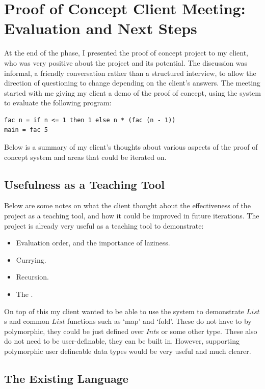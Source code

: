 \section{Proof of Concept Client Meeting: Evaluation and Next Steps}
\label{eval:c1_client}
At the end of the phase, I presented the proof of concept project to my client, who was very positive about the project and its potential. The discussion was informal, a friendly conversation rather than a structured interview, to allow the direction of questioning to change depending on the client's answers. The meeting started with me giving my client a demo of the proof of concept, using the system to evaluate the following program:
\begin{lstlisting}[language=SFL]
fac n = if n <= 1 then 1 else n * (fac (n - 1))
main = fac 5
\end{lstlisting}

\noindent Below is a summary of my client's thoughts about various aspects of the proof of concept system and areas that could be iterated on.

\subsection{Usefulness as a Teaching Tool}
Below are some notes on what the client thought about the effectiveness of the project as a teaching tool, and how it could be improved in future iterations.
The project is already very useful as a teaching tool to demonstrate:
\begin{itemize}
    \item Evaluation order, and the importance of laziness.
    \item Currying.
    \item Recursion.
    \item The \lcalc.
\end{itemize}

\noindent On top of this my client wanted to be able to use the system to demonstrate $List$s and common $List$ functions such as `map' and `fold'. These do not have to by polymorphic, they could be just defined over $Int$s or some other type. These also do not need to be user-definable, they can be built in. However, supporting polymorphic user defineable data types would be very useful and much clearer. 

\subsection{The Existing Language}
